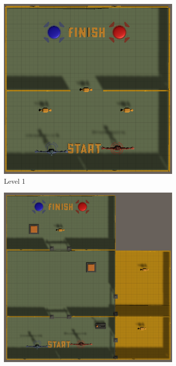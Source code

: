 \begin{figure}[h!]
    \centering
    \begin{subfigure}[b]{0.45\linewidth}
        \includegraphics[width=\linewidth]{images/level_1.png}
        \caption{Level 1}
        \label{fig:level 1}
      \end{subfigure}
    \begin{subfigure}[b]{0.45\linewidth}
        \includegraphics[width=\linewidth]{images/level_3.png}

\end{subfigure}
\end{figure}
